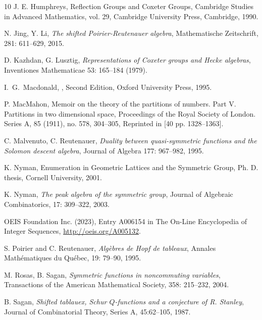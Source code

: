 \documentclass[11pt]{amsart}
\numberwithin{equation}{section}
\begin{document}
\begin{thebibliography}{10}
 J. E. Humphreys, Reflection Groups and Coxeter Groups, Cambridge Studies in Advanced Mathematics, vol. 29,
Cambridge University Press, Cambridge, 1990.

 N. Jing, Y. Li,
\newblock \textit{The shifted Poirier-Reutenauer algebra},
\newblock Mathematische Zeitschrift, 281: 611--629, 2015.

 D. Kazhdan, G. Lusztig, 
\newblock \textit{Representations of Coxeter groups and Hecke algebras}, 
Inventiones Mathematicae 53: 165--184 (1979). 




 I.~G.~Macdonald,
,
\newblock Second Edition, Oxford University Press, 1995.

 P. MacMahon, Memoir on the theory of the partitions of numbers. Part V. Partitions in two dimensional space, Proceedings of the Royal Society of London. Series A, 85 (1911), no. 578, 304–305,
Reprinted in [40 pp. 1328–1363].

 C. Malvenuto, C. Reutenauer,
\newblock \textit{Duality between quasi-symmetric functions and the Solomon descent algebra},
\newblock Journal of Algebra 177: 967--982, 1995.

 K. Nyman, Enumeration in Geometric Lattices and the Symmetric Group, Ph. D. thesis,
Cornell University, 2001.

 K. Nyman,
\newblock \textit{The peak algebra of the symmetric group},
\newblock Journal of Algebraic Combinatorics, 17: 309--322, 2003.

 OEIS Foundation Inc. (2023), Entry A006154 in The On-Line Encyclopedia of Integer Sequences, \href{http://oeis.org/A005132}{http://oeis.org/A005132}.

 S. Poirier and C. Reutenauer,
\newblock \textit{Alg\`{e}bres de Hopf de tableaux},
\newblock Annales Math\'{e}matiques du Qu\'{e}bec, 19: 79--90, 1995.	

 M. Rosas, B. Sagan, 
\newblock \textit{Symmetric functions in noncommuting variables},
\newblock Transactions of the American Mathematical Society, 358: 215--232, 2004.

 B. Sagan, 
\newblock \textit{Shifted tablauex, Schur $Q$-functions and a conjecture of R. Stanley},
\newblock Journal of Combinatorial Theory, Series A, 45:62--105, 1987.


\end{thebibliography}
\end{document}
